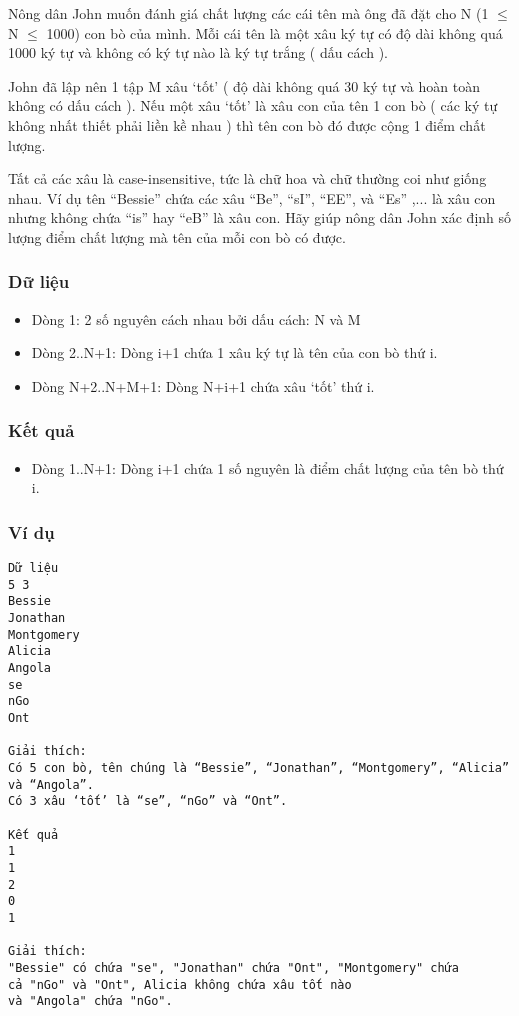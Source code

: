 



   Nông dân John muốn đánh giá chất lượng các cái tên mà ông đã đặt  cho N (1  $\le$  N  $\le$  1000) con bò của mình. Mỗi cái tên là một xâu ký tự  có độ dài không quá 1000 ký tự và không có ký tự nào là ký tự trắng ( dấu cách ).  

   John đã lập nên 1 tập M xâu ‘tốt’ ( độ dài không quá 30 ký tự và hoàn  toàn không có dấu cách ). Nếu một xâu ‘tốt’ là xâu con của tên 1 con  bò ( các ký tự không nhất thiết phải liền kề nhau ) thì tên con bò đó  được cộng 1 điểm chất lượng.  

   Tất cả các xâu là case-insensitive, tức là chữ hoa và chữ thường coi  như giống nhau. Ví dụ tên “Bessie” chứa các xâu “Be”, “sI”, “EE”,  và “Es” ,... là xâu con nhưng không chứa “is” hay “eB” là xâu  con. Hãy giúp nông dân John xác định số lượng điểm chất lượng mà  tên của mỗi con bò có được.  

\subsubsection{   Dữ liệu  }
\begin{itemize}
	\item     Dòng 1: 2 số nguyên cách nhau bởi dấu cách: N và M   
	\item     Dòng 2..N+1: Dòng i+1 chứa 1 xâu ký tự là tên của con bò thứ i.   
	\item     Dòng N+2..N+M+1: Dòng N+i+1 chứa xâu ‘tốt’ thứ i.   
\end{itemize}

\subsubsection{   Kết quả  }
\begin{itemize}
	\item     Dòng 1..N+1: Dòng i+1 chứa 1 số nguyên là điểm chất lượng của tên bò thứ i.   
\end{itemize}

\subsubsection{   Ví dụ  }
\begin{verbatim}
Dữ liệu
5 3
Bessie
Jonathan
Montgomery
Alicia
Angola
se
nGo
Ont

Giải thích:
Có 5 con bò, tên chúng là “Bessie”, “Jonathan”, “Montgomery”, “Alicia” và “Angola”.
Có 3 xâu ‘tốt’ là “se”, “nGo” và “Ont”.

Kết quả
1
1
2
0
1

Giải thích:
"Bessie" có chứa "se", "Jonathan" chứa "Ont", "Montgomery" chứa 
cả "nGo" và "Ont", Alicia không chứa xâu tốt nào 
và "Angola" chứa "nGo".
\end{verbatim}
